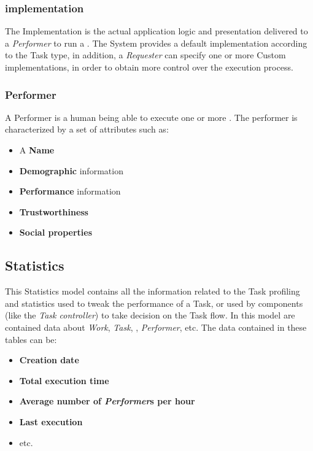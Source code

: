 \subsubsection{\utask{} implementation}
The \utask{} Implementation is the actual application logic and presentation
delivered to a \emph{Performer} to run a \utask{}. The System provides a default
implementation according to the Task type, in addition, a \emph{Requester} can
specify one or more Custom implementations, in order to obtain more control over
the execution process.








\subsubsection{Performer}
A Performer is a human being able to execute one or more \utask{}. The performer is characterized by a set of attributes such as:

\begin{itemize}
    \item A \textbf{Name}
    \item \textbf{Demographic} information
    \item \textbf{Performance} information
    \item \textbf{Trustworthiness}
    \item \textbf{Social properties}
\end{itemize}






\subsection{Statistics}
This Statistics model contains all the information related to the Task profiling
and statistics used to tweak the performance of a Task, or used by components
(like the \emph{Task controller}) to take decision on the Task flow. In this
model are contained data about \emph{Work}, \emph{Task}, \emph{\utask{}},
\emph{Performer}, etc. The data contained in these tables can be:
\begin{itemize}
    \item \textbf{Creation date}
    \item \textbf{Total execution time}
    \item \textbf{Average number of \emph{Performer}s per hour}
    \item \textbf{Last execution}
    \item etc.
\end{itemize}
